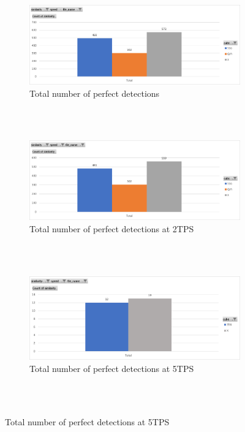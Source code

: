 \begin{figure}
\caption{Perfect Detections by Cube}
\label{fig:perfect-detections-by-cube}
\begin{subfigure}{\textwidth}
    \centering
    \caption{Total number of perfect detections}
    \label{fig:perfect-detections-by-cube-total}
    \includegraphics[width=\linewidth]{Figures/7 Evaluation/perfect_detections_by_cube.png}
\end{subfigure}\\\\
\begin{subfigure}{\textwidth}
    \centering
    \caption{Total number of perfect detections at 2TPS}
    \label{fig:perfect-detections-by-cube-2tps}
    \includegraphics[width=\linewidth]{Figures/7 Evaluation/perfect_detections_by_cube_2tps.png}
\end{subfigure}\\\\
\begin{subfigure}{\textwidth}
    \centering
    \caption{Total number of perfect detections at 5TPS}
    \label{fig:perfect-detections-by-cube-5tps}
    \includegraphics[width=\linewidth]{Figures/7 Evaluation/perfect_detections_by_cube_5tps.png}
\end{subfigure}\\\\
\end{figure}

